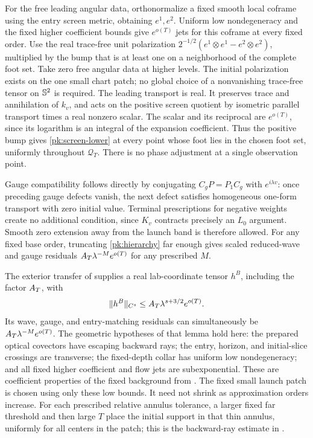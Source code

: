 For the free leading angular data, orthonormalize a fixed smooth local
coframe using the entry screen metric, obtaining $e^1,e^2$. Uniform
low nondegeneracy and the fixed higher coefficient bounds give
$e^{o(T)}$ jets for this coframe at every fixed order. Use the real
trace-free unit polarization
$2^{-1/2}(e^1\otimes e^1-e^2\otimes e^2)$, multiplied by the bump
that is at least one on a neighborhood of the complete foot set.
Take zero free angular data at higher levels.
The initial polarization exists on the one small chart patch; no
global choice of a nonvanishing trace-free tensor on $\mathbb S^2$ is
required. The leading transport is real. It preserves trace and
annihilation of $k_v$, and acts on the positive screen quotient by
isometric parallel transport times a real nonzero scalar. The
scalar and its reciprocal are $e^{o(T)}$, since its logarithm is
an integral of the expansion coefficient. Thus the positive bump
gives \eqref{pk:screen-lower} at every point whose foot lies in
the chosen foot set, uniformly throughout $\mathcal Q_T$.
There is no phase adjustment at a single observation point.

Gauge compatibility follows directly by conjugating
$C_gP=P_1C_g$ with $e^{i\lambda v}$: once preceding gauge defects
vanish, the next defect satisfies homogeneous one-form transport
with zero initial value. Terminal prescriptions for negative
weights create no additional condition, since $K_v$ contracts
precisely an $L_0$ argument. Smooth zero extension away from the launch
band is therefore allowed. For any fixed base order, truncating
\eqref{pk:hierarchy} far enough gives scaled reduced-wave and gauge
residuals $A_T\lambda^{-M}e^{o(T)}$ for any prescribed $M$.

The exterior transfer of \cite[, ]{KerrCOne} supplies a real
lab-coordinate tensor $h^B$, including the factor $A_T$, with
\begin{equation}\label{pk:beam-base}
 \|h^B\|_{C^s}\le A_T\lambda^{s+3/2}e^{o(T)}.
\end{equation}
Its wave, gauge, and entry-matching residuals can simultaneously be
$A_T\lambda^{-M}e^{o(T)}$. The geometric hypotheses of that lemma
hold here: the prepared optical covectors have escaping backward
rays; the entry, horizon, and initial-slice crossings are
transverse; the fixed-depth collar has uniform low nondegeneracy;
and all fixed higher coefficient and flow jets are subexponential.
These are coefficient properties of the fixed background from
. The fixed small launch patch is chosen
using only these low bounds. It need not shrink as approximation
orders increase. For each prescribed relative annulus tolerance,
a larger fixed far threshold and then large $T$ place the initial
support in that thin annulus, uniformly for all centers in the
patch; this is the backward-ray estimate in
\cite[]{KerrCTwo}.

